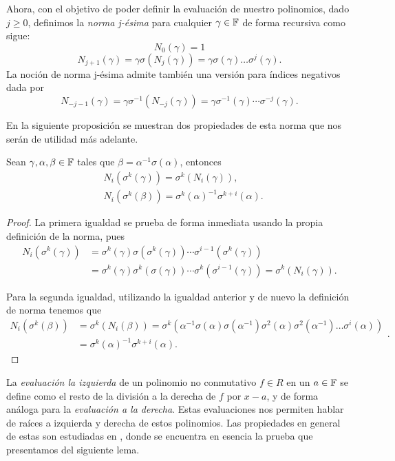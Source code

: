 Ahora, con el objetivo de poder definir la evaluación de nuestro polinomios, dado \(j \geq 0\), definimos la \textit{norma j-ésima} para cualquier \(\gamma \in \mathbb{F}\) de forma recursiva como sigue:
\[
N_0(\gamma) = 1
\]
\[
N_{j+1}(\gamma) = \gamma \sigma(N_{j}(\gamma)) = \gamma \sigma(\gamma)\dots\sigma^{j}(\gamma)
.\]
La noción de norma j-ésima admite también una versión para índices negativos dada por
\[
N_{-j-1}(\gamma) = \gamma \sigma^{-1}(N_{-j}(\gamma)) =  \gamma \sigma^{-1}(\gamma) \cdots \sigma^{-j}(\gamma)
.\]

En la siguiente proposición se muestran dos propiedades de esta norma que nos serán de utilidad más adelante.

\begin{proposition}
\label{prop:norm_properties}
Sean \(\gamma, \alpha, \beta \in \mathbb{F}\) tales que \(\beta = \alpha^{-1}\sigma(\alpha)\), entonces
\[
\begin{aligned}
&N_i(\sigma^{k}(\gamma)) = \sigma^{k}(N_i(\gamma)),\\
&N_i(\sigma^k(\beta)) = \sigma^{k}(\alpha)^{-1} \sigma^{k+i}(\alpha).
\end{aligned}\]
\end{proposition}

\begin{proof}
La primera igualdad se prueba de forma inmediata usando la propia definición de la norma, pues
\[
\begin{aligned}
N_i(\sigma^{k}(\gamma)) &= \sigma^{k}(\gamma) \sigma(\sigma^{k}(\gamma))\cdots \sigma^{i-1}(\sigma^{k}(\gamma)) \\
&= \sigma^{k}(\gamma) \sigma^{k}(\sigma(\gamma))\cdots \sigma^{k}(\sigma^{i-1}(\gamma)) = \sigma^{k}(N_i(\gamma)).
\end{aligned}
\]

Para la segunda igualdad, utilizando la igualdad anterior y de nuevo la definición de norma tenemos que
\[
\begin{aligned}
N_i(\sigma^{k}(\beta)) &= \sigma^{k}(N_i(\beta)) = \sigma^{k}\left(\alpha^{-1}\sigma(\alpha)\sigma(\alpha^{-1})\sigma^{2}(\alpha)\sigma^{2}(\alpha^{-1}) \ldots \sigma^{i}(\alpha) \right) \\
   &= \sigma^{k}(\alpha)^{-1} \sigma^{k+i}(\alpha).
\end{aligned}
.\]
\end{proof}

La \textit{evaluación la izquierda} de un polinomio no conmutativo \(f \in R\) en un \(a \in \mathbb{F}\) se define como el resto de la división a la derecha de \(f\) por  \(x - a\), y de forma análoga para la  \textit{evaluación a la derecha}. Estas evaluaciones nos permiten hablar de raíces a izquierda y derecha de estos polinomios. Las propiedades en general de estas son estudiadas en \cite{lam_vandermonde_1988}, donde se encuentra en esencia la prueba que presentamos del siguiente lema.


